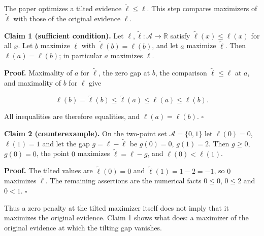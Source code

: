 \documentclass[11pt,a4paper]{report}
\begin{document}
The paper optimizes a tilted evidence \(\tilde\ell\le\ell\). This step compares maximizers of \(\tilde\ell\) with those of the original evidence \(\ell\).




\textbf{Claim 1 (sufficient condition).} Let \(\ell,\tilde\ell:\mathcal A\to\mathbb R\) satisfy \(\tilde\ell(x)\le\ell(x)\) for all \(x\). Let \(b\) maximize \(\ell\) with \(\tilde\ell(b)=\ell(b)\), and let \(a\) maximize \(\tilde\ell\). Then \(\ell(a)=\ell(b)\); in particular \(a\) maximizes \(\ell\).




\textbf{Proof.} Maximality of \(a\) for \(\tilde\ell\), the zero gap at \(b\), the comparison \(\tilde\ell\le\ell\) at \(a\), and maximality of \(b\) for \(\ell\) give


\[\ell(b)=\tilde\ell(b)\le\tilde\ell(a)\le\ell(a)\le\ell(b).\]


All inequalities are therefore equalities, and \(\ell(a)=\ell(b)\). \(\square\)




\textbf{Claim 2 (counterexample).} On the two-point set \(\mathcal A=\{0,1\}\) let \(\ell(0)=0\), \(\ell(1)=1\) and let the gap \(g=\ell-\tilde\ell\) be \(g(0)=0\), \(g(1)=2\). Then \(g\ge0\), \(g(0)=0\), the point \(0\) maximizes \(\tilde\ell=\ell-g\), and \(\ell(0)<\ell(1)\).




\textbf{Proof.} The tilted values are \(\tilde\ell(0)=0\) and \(\tilde\ell(1)=1-2=-1\), so \(0\) maximizes \(\tilde\ell\). The remaining assertions are the numerical facts \(0\le0\), \(0\le2\) and \(0<1\). \(\square\)




Thus a zero penalty at the tilted maximizer itself does not imply that it maximizes the original evidence. Claim 1 shows what does: a maximizer of the original evidence at which the tilting gap vanishes.
\end{document}
